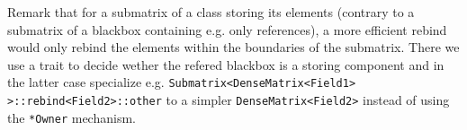 Remark that for a submatrix of a class storing its elements (contrary
to a submatrix of a blackbox containing e.g. only references), a more
efficient rebind would only rebind the elements within the boundaries
of the submatrix. There we use a trait to decide wether the refered
blackbox is a storing component and in the latter case specialize
e.g. \texttt{Submatrix<DenseMatrix<Field1> >::rebind<Field2>::other}
to a simpler \texttt{DenseMatrix<Field2>} instead of using the
\verb!*Owner! mechanism.